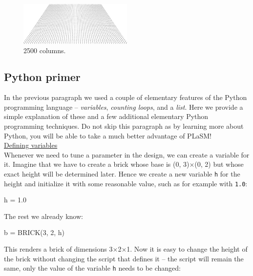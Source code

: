 \begin{figure}[!ht]
\begin{center}
\includegraphics[width=0.5\textwidth]{img/2500.png}
\end{center}
\vspace{-4mm}
\caption{2500 columns.}
\label{fig:2500}
\end{figure}
\noindent


\subsection{Python primer}

In the previous paragraph we used a couple of elementary 
features of the Python programming language -- {\em variables}, 
{\em counting loops}, and a {\em list}. Here we 
provide a simple explanation of these and a few additional 
elementary Python programming techniques. 
Do not skip this paragraph as by learning more about Python, 
you will be able to take a much better advantage of PLaSM!\\

\noindent
\underline{Defining variables}\\

\noindent
Whenever we need to tune a parameter in the design, we can create 
a variable for it. Imagine that we have to create a brick whose base
is (0, 3)$\times$(0, 2) but whose exact height will be determined 
later. Hence  we create a new variable {\tt h} for the height and initialize 
it with some reasonable value, such as for example with {\tt 1.0}:

\begin{bluecode}
h = 1.0
\end{bluecode} 
The rest we already know:

\begin{bluecode}
b = BRICK(3, 2, h)
\end{bluecode} 
This renders a brick of dimensions 3$\times$2$\times$1. Now it is easy to 
change the height of the brick without changing the script that defines it --
the script will remain the same, only the value of the variable {\tt h} needs
to be changed:


